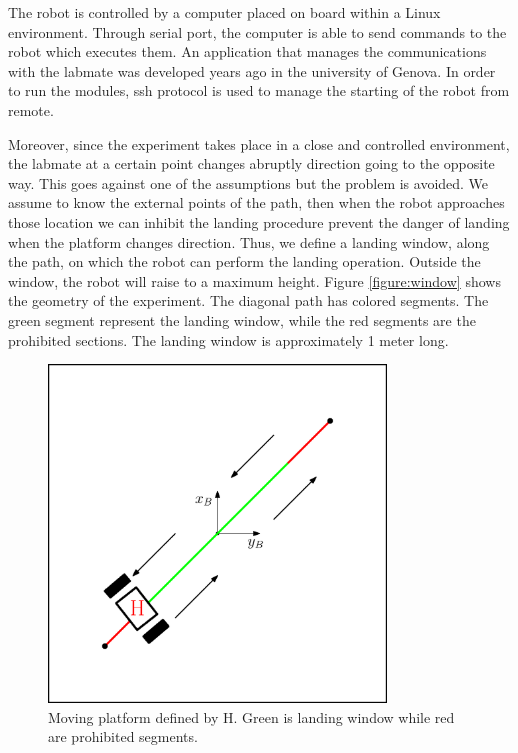 The robot is controlled by a computer placed on board within a Linux environment. Through serial port, the computer is able to send commands to the robot which executes them. An application that manages the communications with the labmate was developed years ago in the university of Genova. In order to run the modules, ssh protocol is used to manage the starting of the robot from remote. 

Moreover, since the experiment takes place in a close and controlled environment, the labmate at a certain point changes abruptly direction going to the opposite way. This goes against one of the assumptions but the problem is avoided. We assume to know the external points of the path, then when the robot approaches those location we can inhibit the landing procedure prevent the danger of landing when the platform changes direction.  Thus, we define a landing window, along the path, on which the robot can perform the landing operation. Outside the window, the robot will raise to a maximum height. Figure \ref{figure:window} shows the geometry of the experiment. The diagonal path has colored segments. The green segment represent the landing window, while the red segments are the prohibited sections. The landing window is approximately 1 meter long. 
\begin{figure}[h]
 \centering
   \includegraphics[width = 0.8\textwidth ]{landwindow3.eps}
    \caption[Experiment geometry]{Moving platform defined by H. Green is landing window while red are prohibited segments.}
   \label{figure:landwindow}
\end{figure}


